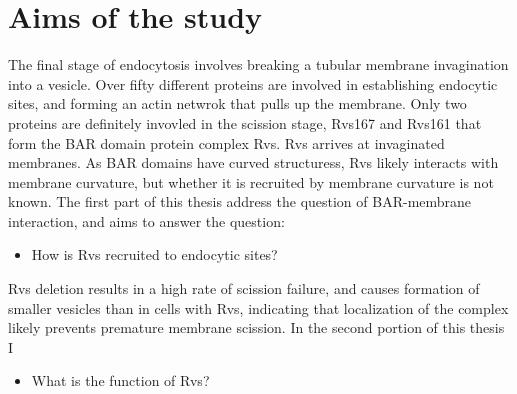 
\chapter{Aims of the study} %

\label{Ch:Aims} %

The final stage of endocytosis involves breaking a tubular membrane invagination into a vesicle. Over fifty different proteins are involved in establishing endocytic sites, and forming an actin netwrok that pulls up the membrane. Only two proteins are  definitely invovled in the scission stage, Rvs167 and Rvs161 that form the  BAR domain protein complex Rvs. Rvs arrives at invaginated membranes. As BAR domains have curved structuress, Rvs likely interacts with membrane curvature, but whether it is recruited by membrane curvature is not known. The first part of this thesis address the question of BAR-membrane interaction, and aims to answer the question:


\begin{itemize}
	\item How is Rvs recruited to endocytic sites? 
\end{itemize}

Rvs deletion results in a high rate of scission failure, and causes formation of smaller vesicles than in cells with Rvs, indicating that localization of the complex likely prevents premature membrane scission. In the second portion of this thesis I 

\begin{itemize}
	\item What is the function of Rvs?
\end{itemize}